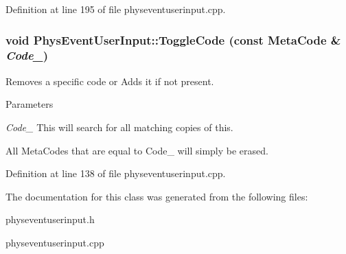 Definition at line 195 of file physeventuserinput.cpp.

\hypertarget{classPhysEventUserInput_a8325bb0172db6ea02fd06f4a5d1a7378}{
\subsubsection[{ToggleCode}]{\setlength{\rightskip}{0pt plus 5cm}void PhysEventUserInput::ToggleCode (const {\bf MetaCode} \& {\em Code\_\-})}}
\label{dc/d0e/classPhysEventUserInput_a8325bb0172db6ea02fd06f4a5d1a7378}


Removes a specific code or Adds it if not present. 


\begin{DoxyParams}{Parameters}
\item[{\em Code\_\-}]This will search for all matching copies of this.\end{DoxyParams}
All MetaCodes that are equal to Code\_\- will simply be erased. 

Definition at line 138 of file physeventuserinput.cpp.



The documentation for this class was generated from the following files:\begin{DoxyCompactItemize}
\item 
physeventuserinput.h\item 
physeventuserinput.cpp\end{DoxyCompactItemize}
